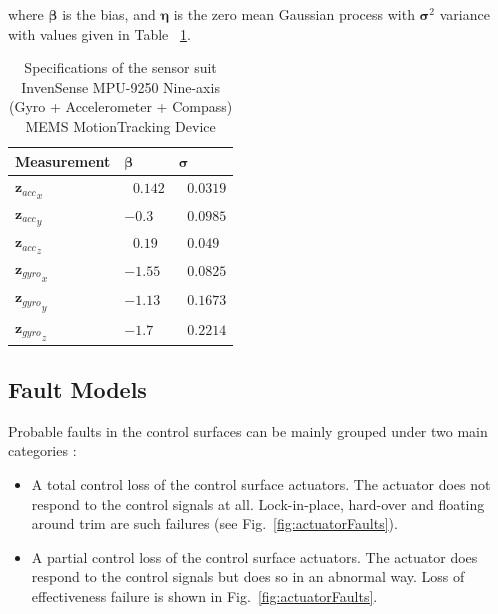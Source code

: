 where $\bm{\beta}$ is the bias, and $\bm{\eta}$ is the zero mean Gaussian process with $\bm{\sigma}^2$ variance with values given in Table ~\ref{arm:sensorSpecs}.

\begin{table}[!htbp]
\caption{Specifications of the sensor suit InvenSense MPU-9250 Nine-axis (Gyro + Accelerometer + Compass) MEMS MotionTracking Device\cite{condomines2015developpement}}
\label{arm:sensorSpecs}
\begin{center}
\begin{tabular}{ ||p{3cm}|p{2cm}|p{1.5cm}||}\hline
\textbf{Measurement} & $ \bm{\beta}$ &  $ \bm{\sigma}$ \\\hline
${\bm{z}_{acc}}_x$                  & $\ \ \, 0.142 $	   & $\ \ \, 0.0319$ \\\hline
${\bm{z}_{acc}}_y$       & $ -0.3 $           &  $\ \ \, 0.0985$ \\\hline
${\bm{z}_{acc}}_z$           & $\ \ \, 0.19$           & $\ \ \, 0.049$ \\\hline
${\bm{z}_{gyro}}_x$                  & $-1.55 $	   & $\ \ \, 0.0825$ \\\hline
${\bm{z}_{gyro}}_y$       & $ -1.13 $           &  $\ \ \, 0.1673$ \\\hline
${\bm{z}_{gyro}}_z$           & $-1.7$           & $\ \ \, 0.2214$ \\\hline
\end{tabular}
\end{center}
\end{table}


\subsection{Fault Models}

Probable faults in the control surfaces can be mainly grouped under two main categories \cite{zhong2014contribution}: 

\begin{itemize}
\item{A total control loss of the control surface actuators. The actuator does not respond to the control signals at all. Lock-in-place, hard-over and floating around trim are such failures (see Fig.~\ref{fig:actuatorFaults}).}
\item{A partial control loss of the control surface actuators. The actuator does respond to the control signals but does so in an abnormal way. Loss of effectiveness failure is shown in Fig.~\ref{fig:actuatorFaults}.}
\end{itemize}

